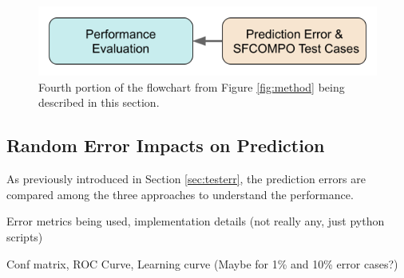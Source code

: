 
\begin{figure}[H]
  \centering
  \includegraphics[width=0.7\linewidth]{./chapters/exp1/methodology4.png}
  \caption{Fourth portion of the flowchart from Figure \ref{fig:method} being 
           described in this section.}
\end{figure}

\subsection{Random Error Impacts on Prediction}
\label{sec:randerr}

As previously introduced in Section \ref{sec:testerr}, the prediction errors
are compared among the three approaches to understand the performance.

Error metrics being used, implementation details (not really any, just python scripts)

Conf matrix, ROC Curve, Learning curve (Maybe for 1\% and 10\% error cases?)

